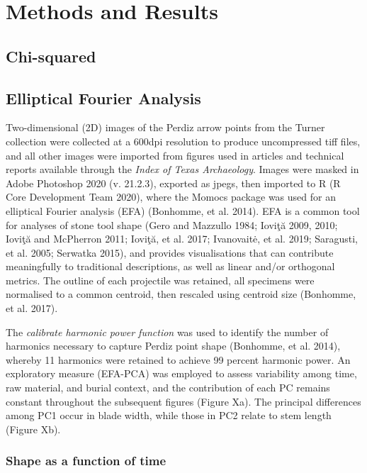 \documentclass[review]{elsarticle}
\begin{document}
\section*{Methods and Results}

\subsection*{Chi-squared}

\subsection*{Elliptical Fourier Analysis}

Two-dimensional (2D) images of the Perdiz arrow points from the Turner collection were collected at a 600dpi resolution to produce uncompressed tiff files, and all other images were imported from figures used in articles and technical reports available through the \textit{Index of Texas Archaeology}. Images were masked in Adobe Photoshop 2020 (v. 21.2.3), exported as jpegs, then imported to R (R Core Development Team 2020), where the Momocs package was used for an elliptical Fourier analysis (EFA) (Bonhomme, et al. 2014). EFA is a common tool for analyses of stone tool shape (Gero and Mazzullo 1984; Ioviţă 2009, 2010; Ioviţă and McPherron 2011; Ioviţă, et al. 2017; Ivanovaitė, et al. 2019; Saragusti, et al. 2005; Serwatka 2015), and provides visualisations that can contribute meaningfully to traditional descriptions, as well as linear and/or orthogonal metrics. The outline of each projectile was retained, all specimens were normalised to a common centroid, then rescaled using centroid size (Bonhomme, et al. 2017). 

The \textit{calibrate harmonic power function} was used to identify the number of harmonics necessary to capture Perdiz point shape (Bonhomme, et al. 2014), whereby 11 harmonics were retained to achieve 99 percent harmonic power. An exploratory measure (EFA-PCA) was employed to assess variability among time, raw material, and burial context, and the contribution of each PC remains constant throughout the subsequent figures (Figure Xa). The principal differences among PC1 occur in blade width, while those in PC2 relate to stem length (Figure Xb). 

\subsubsection*{Shape as a function of time}
\end{document}
